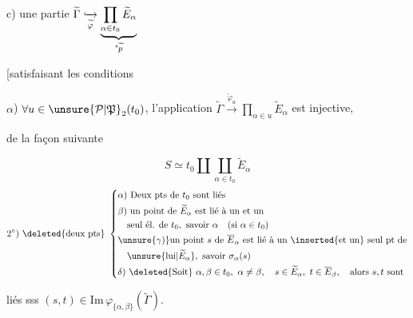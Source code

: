 c) une partie $\widetilde\Gamma\lhook\joinrel\xrightarrow[\widetilde\varphi]{}\underbrace{\prod_{\alpha\in t_0}\widetilde E_\alpha}_{\text{\textquotedbl}\widetilde p}$

[satisfaisant les conditions

$\alpha$) $\forall u\in\unsure{\mathcal P|\mathfrak P}_2(t_0)$, l'application $\widetilde\Gamma\xrightarrow{\widetilde\varphi_u}\prod_{\alpha\in u}\widetilde E_\alpha$ est injective,


de la façon suivante

\[
S\simeq t_0\amalg\coprod_{\alpha\in t_0}\widetilde E_\alpha \tag*{$1^\circ$)}
\]
\[
2^\circ)\ \deleted{\text{deux pts}}\ \left\{\begin{aligned}
&\alpha)\ \text{Deux pts de }t_0\text{ sont liés}\\
&\beta)\ \text{un point de }\widetilde E_\alpha\text{ est lié à un et un}\\
&\quad\text{seul él. de }t_0,\ \text{savoir }\alpha\quad(\text{si }\alpha\in t_0)\\
&\unsure{\gamma) }\text{un point }s\text{ de }\overline E_\alpha\text{ est lié à un }\inserted{\text{et un}}\text{ seul pt de}\\
&\quad\unsure{\text{lui}|\widetilde E_\alpha},\ \text{savoir }\sigma_\alpha(s)\\
&\delta)\ \deleted{\text{Soit}}\ \alpha,\beta\in t_0,\ \alpha\ne\beta,\quad s\in\widetilde E_\alpha,\ t\in\overline E_\beta,\quad\text{alors }s,t\text{ sont}
\end{aligned}\right.
\]

liés sss $(s,t)\in\mathrm{Im}\,\varphi_{\{\alpha,\beta\}}(\widetilde\Gamma)$.

